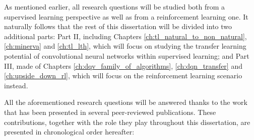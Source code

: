 As mentioned earlier, all research questions will be studied both from a supervised learning perspective as well as from a reinforcement learning one. It naturally follows that the rest of this dissertation will be divided into two additional parts: Part II, including Chapters \ref{ch:tl_natural_to_non_natural}, \ref{ch:minerva} and \ref{ch:tl_lth}, which will focus on studying the transfer learning potential of convolutional neural networks within supervised learning; and Part III, made of Chapters \ref{ch:dqv_family_of_algorithms}, \ref{ch:dqn_transfer} and \ref{ch:upside_down_rl}, which will focus on the reinforcement learning scenario instead.

All the aforementioned research questions will be answered thanks to the work that has been presented in several peer-reviewed publications. These contributions, together with the role they play throughout this dissertation, are presented in chronological order hereafter:

\bigskip

